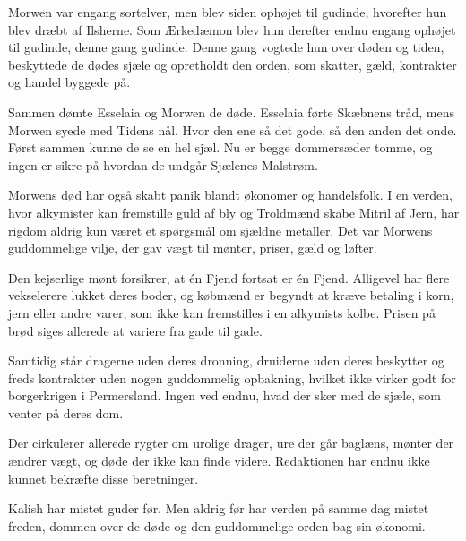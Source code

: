 \documentclass[a4paper,12pt]{memoir}
\begin{document}
Morwen var engang sortelver, men blev siden ophøjet til gudinde, hvorefter hun blev dræbt af Ilsherne. Som Ærkedæmon blev hun derefter endnu engang ophøjet til gudinde, denne gang gudinde. Denne gang vogtede hun over døden og tiden, beskyttede de dødes sjæle og opretholdt den orden, som skatter, gæld, kontrakter og handel byggede på. 

\par\medskip 

Sammen dømte Esselaia og Morwen de døde. Esselaia førte Skæbnens tråd, mens Morwen syede med Tidens nål. Hvor den ene så det gode, så den anden det onde. Først sammen kunne de se en hel sjæl. Nu er begge dommersæder tomme, og ingen er sikre på hvordan de undgår Sjælenes Malstrøm.

\par\medskip 

Morwens død har også skabt panik blandt økonomer og handelsfolk. I en verden, hvor alkymister kan fremstille guld af bly og Troldmænd skabe Mitril af Jern, har rigdom aldrig kun været et spørgsmål om sjældne metaller. Det var Morwens guddommelige vilje, der gav vægt til mønter, priser, gæld og løfter. 

\par\medskip 

Den kejserlige mønt forsikrer, at én Fjend fortsat er én Fjend. Alligevel har flere vekselerere lukket deres boder, og købmænd er begyndt at kræve betaling i korn, jern eller andre varer, som ikke kan fremstilles i en alkymists kolbe. Prisen på brød siges allerede at variere fra gade til gade. 

\par\medskip 

Samtidig står dragerne uden deres dronning, druiderne uden deres beskytter og freds kontrakter uden nogen guddommelig opbakning, hvilket ikke virker godt for borgerkrigen i Permersland. Ingen ved endnu, hvad der sker med de sjæle, som venter på deres dom. 

\par\medskip 

Der cirkulerer allerede rygter om urolige drager, ure der går baglæns, mønter der ændrer vægt, og døde der ikke kan finde videre. Redaktionen har endnu ikke kunnet bekræfte disse beretninger. 

\par\medskip 

Kalish har mistet guder før. Men aldrig før har verden på samme dag mistet freden, dommen over de døde og den guddommelige orden bag sin økonomi. 
\end{document}
